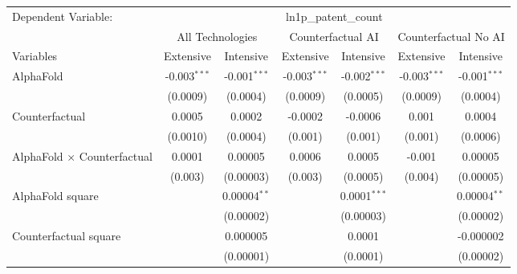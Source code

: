 \begingroup
\centering
\begin{tabular}{lcccccc}
   \tabularnewline \midrule \midrule
   Dependent Variable: & \multicolumn{6}{c}{ln1p\_patent\_count}\\
 & \multicolumn{2}{c}{All Technologies} & \multicolumn{2}{c}{Counterfactual AI} & \multicolumn{2}{c}{Counterfactual No AI} \\
\cmidrule(lr){1-1}\cmidrule(lr){2-3} \cmidrule(lr){4-5} \cmidrule(lr){6-7}
Variables & \multicolumn{1}{c}{Extensive} & \multicolumn{1}{c}{Intensive} & \multicolumn{1}{c}{Extensive} & \multicolumn{1}{c}{Intensive} & \multicolumn{1}{c}{Extensive} & \multicolumn{1}{c}{Intensive} \\
\cmidrule(lr){1-1}\cmidrule(lr){2-2} \cmidrule(lr){3-3} \cmidrule(lr){4-4} \cmidrule(lr){5-5} \cmidrule(lr){6-6} \cmidrule(lr){7-7}
   AlphaFold                          & -0.003$^{***}$ & -0.001$^{***}$     & -0.003$^{***}$ & -0.002$^{***}$ & -0.003$^{***}$ & -0.001$^{***}$\\   
                                      & (0.0009)       & (0.0004)           & (0.0009)       & (0.0005)       & (0.0009)       & (0.0004)\\   
   Counterfactual                     & 0.0005         & 0.0002             & -0.0002        & -0.0006        & 0.001          & 0.0004\\   
                                      & (0.0010)       & (0.0004)           & (0.001)        & (0.001)        & (0.001)        & (0.0006)\\   
   AlphaFold $\times$ Counterfactual  & 0.0001         & 0.00005            & 0.0006         & 0.0005         & -0.001         & 0.00005\\   
                                      & (0.003)        & (0.00003)          & (0.003)        & (0.0005)       & (0.004)        & (0.00005)\\   
   AlphaFold square                   &                & 0.00004$^{**}$     &                & 0.0001$^{***}$ &                & 0.00004$^{**}$\\   
                                      &                & (0.00002)          &                & (0.00003)      &                & (0.00002)\\   
   Counterfactual square              &                & 0.000005           &                & 0.0001         &                & -0.000002\\   
                                      &                & (0.00001)          &                & (0.0001)       &                & (0.00002)\\   

\end{tabular}
